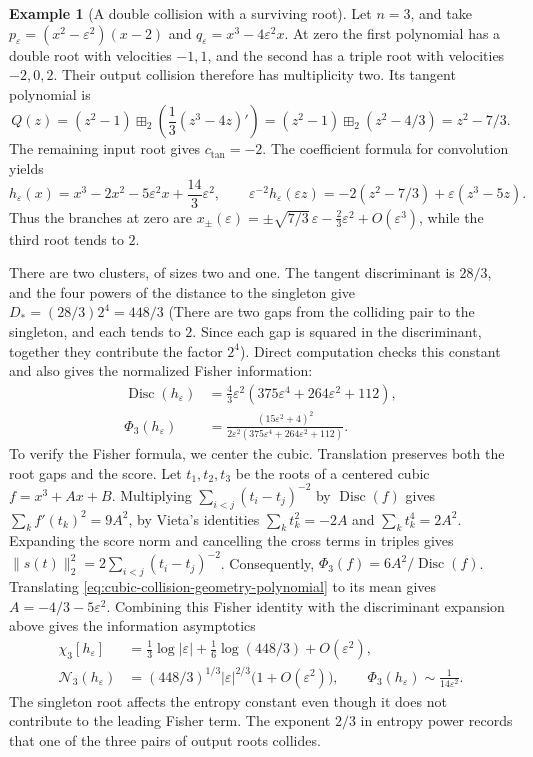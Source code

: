 \documentclass[12pt,reqno]{amsart}
\theoremstyle{definition}
\newtheorem{example}[example]{Example}
\theoremstyle{remark}
\newcommand{\cN}{\mathcal N}
\newcommand{\eps}{\varepsilon}
\begin{document}
\begin{example}[A double collision with a surviving root]
\label{ex:cubic-collision-geometry}
Let \(n=3\), and take
\(p_\eps=(x^2-\eps^2)(x-2)\) and
\(q_\eps=x^3-4\eps^2x\).  At zero the first polynomial has a
double root with velocities \(-1,1\), and the second has a triple
root with velocities \(-2,0,2\).  Their output collision therefore
has multiplicity two.  Its tangent polynomial is
\[
 Q(z)=(z^2-1)\boxplus_2
             \left(\frac13(z^3-4z)'\right)
      =(z^2-1)\boxplus_2(z^2-4/3)=z^2-7/3.
\]
The remaining input root gives \(c_{\mathrm{tan}}=-2\).  The coefficient formula
for convolution yields
\begin{equation}\label{eq:cubic-collision-geometry-polynomial}
 h_\eps(x)=x^3-2x^2-5\eps^2x+\frac{14}{3}\eps^2,
 \qquad
 \eps^{-2}h_\eps(\eps z)
       =-2(z^2-7/3)+\eps(z^3-5z).
\end{equation}
Thus the branches at zero are
\(x_\pm(\eps)=\pm\sqrt{7/3}\,\eps-\frac23\eps^2+O(\eps^3)\),
while the third root tends to \(2\).

There are two clusters, of sizes two and one. The tangent discriminant
is \(28/3\), and the four powers of the distance to the singleton
give \(D_*=(28/3)2^4=448/3\) (There are two gaps from the colliding pair to the singleton, and each tends to \(2\). Since each gap is squared in the discriminant, together they contribute the factor \(2^4\)).  Direct computation checks this
constant and also gives the normalized Fisher information:
\begin{align}
 \operatorname{Disc}(h_\eps)
   &=\frac43\eps^2(375\eps^4+264\eps^2+112),
       \label{eq:cubic-collision-geometry-discriminant}\\
 \Phi_3(h_\eps)
   &=\frac{(15\eps^2+4)^2}
          {2\eps^2(375\eps^4+264\eps^2+112)}.
       \label{eq:cubic-collision-geometry-fisher}
\end{align}
To verify the Fisher formula, we center the cubic. Translation preserves both the root gaps and the score. Let \(t_1,t_2,t_3\) be the roots of a
centered cubic \(f=x^3+Ax+B\).  Multiplying
\(\sum_{i<j}(t_i-t_j)^{-2}\) by \(\operatorname{Disc}(f)\)
gives \(\sum_k f'(t_k)^2=9A^2\), by Vieta's identities
\(\sum_k t_k^2=-2A\) and \(\sum_k t_k^4=2A^2\).
Expanding the score norm and cancelling the cross terms in triples gives
\(\|s(t)\|_2^2=2\sum_{i<j}(t_i-t_j)^{-2}\).  Consequently,
\(\Phi_3(f)=6A^2/\operatorname{Disc}(f)\).  Translating
\eqref{eq:cubic-collision-geometry-polynomial} to its mean gives
\(A=-4/3-5\eps^2\). Combining this Fisher identity with the discriminant expansion above gives the information asymptotics
\begin{align*}
 \chi_3[h_\eps]
   &=\frac13\log|\eps|+\frac16\log(448/3)+O(\eps^2),\\
 \cN_3(h_\eps)
   &=(448/3)^{1/3}|\eps|^{2/3}\bigl(1+O(\eps^2)\bigr),
 \qquad
 \Phi_3(h_\eps)\sim\frac1{14\eps^2}.
\end{align*}
The singleton root affects the entropy constant even though it does not
contribute to the leading Fisher term.  The exponent \(2/3\) in
entropy power records that one of the three pairs of output roots
collides.
\end{example}
\end{document}
